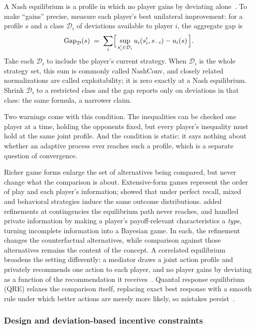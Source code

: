 A Nash equilibrium is a profile in which no player gains by deviating
alone~\citep{Nash1951}. To make ``gains'' precise, measure each player's best
unilateral improvement: for a profile $s$ and a class $\mathcal{D}_i$ of
deviations available to player $i$, the aggregate gap is
\[
  \mathrm{Gap}_{\mathcal{D}}(s)
  \;=\;
  \sum_i \Bigl[\, \sup_{s_i' \in \mathcal{D}_i} u_i(s_i', s_{-i}) - u_i(s) \,\Bigr].
\]
Take each $\mathcal{D}_i$ to include the player's current strategy. When
$\mathcal{D}_i$ is the whole strategy set, this sum is commonly called NashConv,
and closely related normalizations are called exploitability; it is zero exactly
at a Nash equilibrium. Shrink $\mathcal{D}_i$ to a restricted class and the gap reports only on deviations in that class: the same formula, a narrower
claim.

Two warnings come with this condition. The inequalities can be checked one player
at a time, holding the opponents fixed, but every player's inequality must hold at
the same joint profile. And the condition is static: it says nothing about
whether an adaptive process ever reaches such a profile, which is a separate
question of convergence.

Richer game forms enlarge the set of alternatives being compared, but never
change what the comparison is about. Extensive-form games represent the order of
play and each player's information; \citet{Kuhn1953} showed that under perfect
recall, mixed and behavioral strategies induce the same outcome distributions.
\citet{Selten1975} added refinements at contingencies the equilibrium path never
reaches, and \citet{Harsanyi1968} handled private information by making a player's
payoff-relevant characteristics a \emph{type}, turning incomplete information into
a Bayesian game. In each, the refinement changes the counterfactual alternatives,
while comparison against those alternatives remains the content of the concept. A
correlated equilibrium broadens the setting differently: a mediator draws a joint
action profile and privately recommends one action to each player, and no player
gains by deviating as a function of the recommendation it
receives~\citep{Aumann1974}. Quantal response equilibrium (QRE) relaxes the comparison
itself, replacing exact best response with a smooth rule under which better
actions are merely more likely, so mistakes persist~\citep{McKelveyPalfrey1995}.

\subsubsection{Design and deviation-based incentive constraints}

